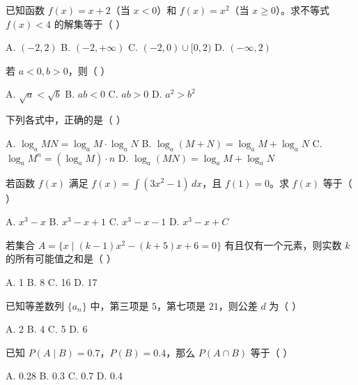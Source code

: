 \documentclass[11pt, a4paper]{article}
\begin{document}
\begin{baitap}[38]
已知函数 $f(x) = x + 2$（当 $x < 0$）和 $f(x) = x^2$（当 $x \ge 0$）。求不等式 $f(x) < 4$ 的解集等于（ ）
\par\vspace{3pt}
\noindent A. $(-2,2)$ \quad B. $(-2,+\infty)$ \quad C. $(-2,0) \cup [0,2)$ \quad D. $(-\infty,2)$
\end{baitap}

\begin{baitap}[39]
若 $a < 0, b > 0$，则（ ）
\par\vspace{3pt}
\noindent A. $\sqrt{a} < \sqrt{b}$ \quad B. $ab < 0$ \quad C. $ab > 0$ \quad D. $a^2 > b^2$
\end{baitap}

\begin{baitap}[40]
下列各式中，正确的是（ ）
\par\vspace{3pt}
\noindent A. $\log_a MN = \log_a M \cdot \log_a N$ \quad B. $\log_a(M+N) = \log_a M + \log_a N$ \quad C. $\log_a M^n = (\log_a M) \cdot n$ \quad D. $\log_a(MN) = \log_a M + \log_a N$
\end{baitap}

\begin{baitap}[41]
若函数 $f(x)$ 满足 $f(x) = \displaystyle\int (3x^2 - 1)\,dx$，且 $f(1) = 0$。求 $f(x)$ 等于（ ）
\par\vspace{3pt}
\noindent A. $x^3 - x$ \quad B. $x^3 - x + 1$ \quad C. $x^3 - x - 1$ \quad D. $x^3 - x + C$
\end{baitap}

\begin{baitap}[42]
若集合 $A = \{x \mid (k-1)x^2 - (k+5)x + 6 = 0\}$ 有且仅有一个元素，则实数 $k$ 的所有可能值之和是（ ）
\par\vspace{3pt}
\noindent A. 1 \quad B. 8 \quad C. 16 \quad D. 17
\end{baitap}

\begin{baitap}[43]
已知等差数列 $\{a_n\}$ 中，第三项是 $5$，第七项是 $21$，则公差 $d$ 为（ ）
\par\vspace{3pt}
\noindent A. 2 \quad B. 4 \quad C. 5 \quad D. 6
\end{baitap}

\begin{baitap}[44]
已知 $P(A \mid B) = 0.7$，$P(B) = 0.4$，那么 $P(A \cap B)$ 等于（ ）
\par\vspace{3pt}
\noindent A. 0.28 \quad B. 0.3 \quad C. 0.7 \quad D. 0.4
\end{baitap}
\end{document}
